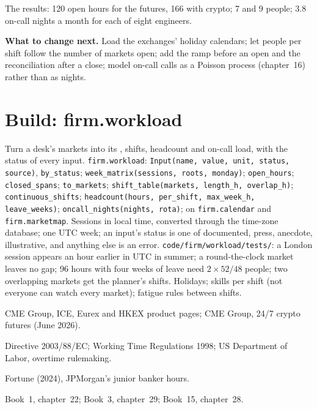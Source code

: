 The results: 120 open hours for the futures, 166 with crypto; 7 and 9 people; 3.8 on-call nights a month for each of
eight engineers.

\textbf{What to change next.} Load the exchanges' holiday calendars; let people per shift follow the number of markets
open; add the ramp before an open and the reconciliation after a close; model on-call calls as a Poisson process
(chapter~16) rather than as nights.

\section{Build: firm.workload}\label{bld:in:hours-rhythm-and-intensity:workload}

\begin{build}
 Turn a desk's markets into its , shifts, headcount and on-call load, with the status
of every input.
 \texttt{firm.workload}: \texttt{Input(name, value, unit, status, source)}, \texttt{by\_status};
\texttt{week\_matrix(sessions, roots, monday)}; \texttt{open\_hours}; \texttt{closed\_spans}; \texttt{to\_markets};
\texttt{shift\_table(markets, length\_h, overlap\_h)}; \texttt{continuous\_shifts}; \texttt{headcount(hours, per\_shift,
max\_week\_h, leave\_weeks)}; \texttt{oncall\_nights(nights, rota)}; on \texttt{firm.calendar} and
\texttt{firm.marketmap}.
 Sessions in local time, converted through the time-zone database; one UTC week; an input's status is one
of documented, press, anecdote, illustrative, and anything else is an error.
 \texttt{code/firm/workload/tests/}: a London session appears an hour earlier in UTC in summer; a
round-the-clock market leaves no gap; 96 hours with four weeks of leave need $2\times52/48$ people; two overlapping
markets get the planner's shifts.
 Holidays; skills per shift (not everyone can watch every market); fatigue rules between shifts.
\end{build}

\begin{omsources}
\item CME Group, ICE, Eurex and HKEX product pages; CME Group, 24/7 crypto futures (June 2026).
\item Directive 2003/88/EC; Working Time Regulations 1998; US Department of Labor, overtime rulemaking.
\item Fortune (2024), JPMorgan's junior banker hours.
\item Book~1, chapter~22; Book~3, chapter~29; Book~15, chapter~28.
\end{omsources}

